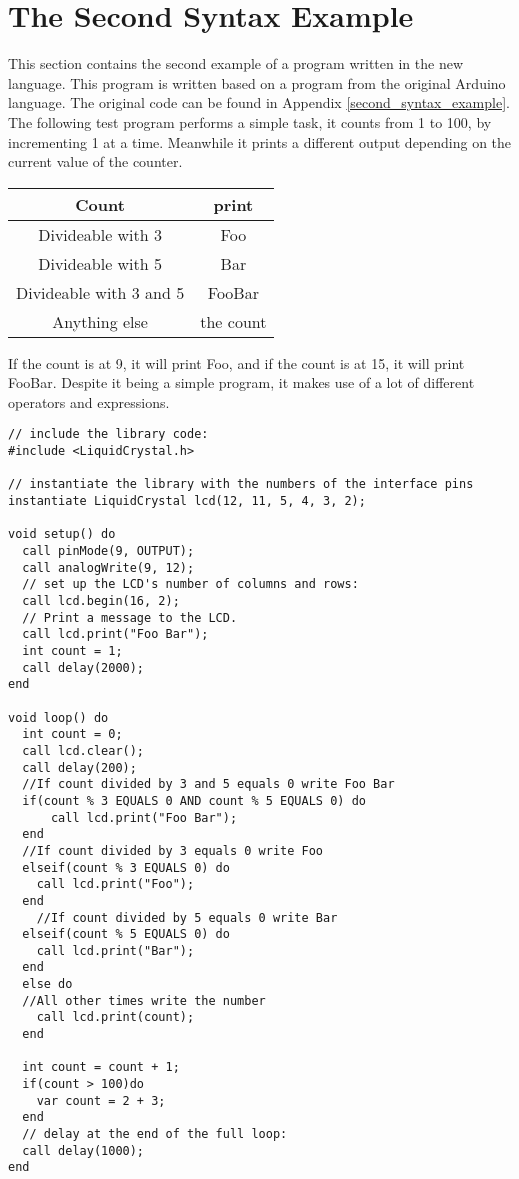 \section{The Second Syntax Example}
This section contains the second example of a program written in the new language. This program is written based on a program from the original Arduino language. The original code can be found in Appendix \ref{second_syntax_example}. The following test program performs a simple task,
it counts from 1 to 100, by incrementing 1 at a time. Meanwhile it prints a different output depending on the current value of the counter.\\
\begin{table}[H]
\centering
\begin{tabular}{|c|c|}
\hline 
Count & print \\ 
\hline 
Divideable with 3 & Foo \\ 
\hline 
Divideable with 5 & Bar \\ 
\hline 
Divideable with 3 and 5 & FooBar \\ 
\hline 
Anything else & the count \\ 
\hline 
\end{tabular} 
\end{table}

If the count is at 9, it will print Foo, and if the count is at 15, it will print FooBar. Despite it being a simple program, it makes use of a lot of different operators and expressions.

\begin{lstlisting}[caption=LCD code example based on the source language, label=lst:syntax2]
// include the library code:
#include <LiquidCrystal.h>

// instantiate the library with the numbers of the interface pins
instantiate LiquidCrystal lcd(12, 11, 5, 4, 3, 2);

void setup() do
  call pinMode(9, OUTPUT);
  call analogWrite(9, 12);
  // set up the LCD's number of columns and rows: 
  call lcd.begin(16, 2);
  // Print a message to the LCD.
  call lcd.print("Foo Bar");
  int count = 1;
  call delay(2000);
end

void loop() do
  int count = 0;
  call lcd.clear();
  call delay(200);
  //If count divided by 3 and 5 equals 0 write Foo Bar
  if(count % 3 EQUALS 0 AND count % 5 EQUALS 0) do
      call lcd.print("Foo Bar"); 
  end
  //If count divided by 3 equals 0 write Foo 
  elseif(count % 3 EQUALS 0) do
    call lcd.print("Foo");
  end
    //If count divided by 5 equals 0 write Bar 
  elseif(count % 5 EQUALS 0) do
    call lcd.print("Bar");
  end
  else do
  //All other times write the number
    call lcd.print(count);
  end
  
  int count = count + 1;
  if(count > 100)do
    var count = 2 + 3;
  end
  // delay at the end of the full loop:
  call delay(1000);
end
\end{lstlisting}
